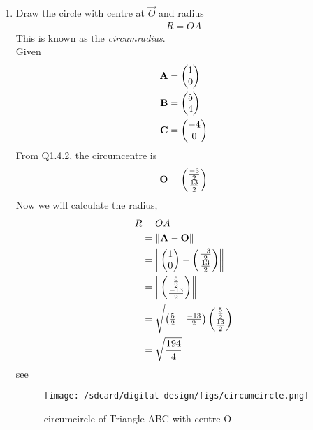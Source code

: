 \documentclass[11pt]{book}
\begin{document}
\begin{enumerate}[label=\thesection.\arabic*.,ref=\thesection.\theenumi]
\item Draw the circle with centre at $\vec{O}$ and radius 
\begin{align}
R = OA
\end{align}
This is known as the {\em circumradius}. \\
\solution
Given
\begin{align}
\mathbf{A} &= \begin{pmatrix}1\\0\end{pmatrix}\\
\mathbf{B} &= \begin{pmatrix}5\\4\end{pmatrix}\\
\mathbf{C} &= \begin{pmatrix}-4\\0\end{pmatrix}
\end{align}
From Q1.4.2, the circumcentre is
\begin{align}
\mathbf{O} = \begin{pmatrix}\frac{-3}{2}\\ \frac{13}{2}\end{pmatrix}
\end{align}
Now we will calculate the radius,
\begin{align}
      R &= OA\\
        &= \left\lVert\mathbf{A} - \mathbf{O}\right\rVert\\
        &= \left\lVert\begin{pmatrix}1\\0\end{pmatrix} - \begin{pmatrix}\frac{-3}{2}\\ \frac{13}{2}\end{pmatrix}\right\rVert\\
        &= \left\lVert\begin{pmatrix}\frac{5}{2}\\ \frac{-13}{2}\end{pmatrix}\right\rVert\\
        &=\sqrt{\begin{pmatrix}\frac{5}{2} & \frac{-13}{2}\end{pmatrix}\begin{pmatrix}\frac{5}{2} \\ \frac{13}{2}\end{pmatrix}} \\
        &= \sqrt{\frac{194}{4}}\\
\end{align}
see 
\begin{figure}[H]
\centering
\texttt{[image: /sdcard/digital-design/figs/circumcircle.png]}
\caption{circumcircle of Triangle ABC with centre O}
\label{fig:circumcircle with centre O}	
\end{figure}


\end{enumerate}
\end{document}
